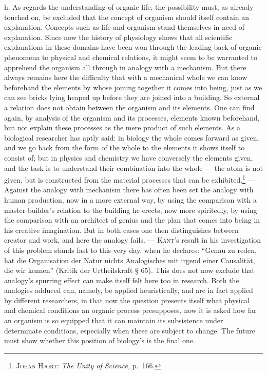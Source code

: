 \documentclass[12pt]{book}
\newcommand{\opage}[1]{\marginnote{\footnotesize\textit{[#1]}}}
\begin{document}
h. As regards the understanding of organic life, the possibility must, as already
touched on, be excluded that the concept of organism should itself contain an
explanation. Concepts such as life and organism stand themselves in need of
explanation. Since now the history of physiology shows that all scientific
explanations in these domains have been won through the leading back of organic
phenomena to physical and chemical relations, it might seem to be warranted to
apprehend the organism all through in analogy with a mechanism. But there always
remains here the difficulty that with a mechanical whole we can know beforehand
the elements by whose joining together it comes into being, just as we can see
bricks lying heaped up before they are joined into a building. So external a
relation does not obtain between the organism and its elements. One can find
again, by analysis of the organism and its processes, elements known beforehand,
but not explain these processes as the mere product of such elements. As a
biological researcher has aptly said: in biology the whole comes forward as given,
and we go back from the form of the whole to the elements it shows itself to
consist of; but in physics and chemistry we have conversely the elements given,
and the task is to understand their combination into the whole --- the atom is not
given, but is constructed from the material processes that can be
exhibited.\footnote{\textsc{Johan Hjort:} \textit{The Unity of Science,} p.\ 166.}
--- Against the analogy with mechanism there has often been set the analogy with
human production, now in a more external way, by using the comparison with a
master-builder's relation to the building he erects, now more spiritedly, by using
the comparison with an architect of genius \opage{107}and the plan that comes into being in
his creative imagination. But in both cases one then distinguishes between creator
and work, and here the analogy fails. --- \textsc{Kant}'s result in his
investigation of this problem stands fast to this very day, when he declares:
``Genau zu reden, hat die Organisation der Natur nichts Analogisches mit irgend
einer Causalität, die wir kennen'' (Kritik der Urtheilskraft § 65). This does not
now exclude that analogy's spurring effect can make itself felt here too in
research. Both the analogies adduced can, namely, be applied heuristically, and
are in fact applied by different researchers, in that now the question presents
itself what physical and chemical conditions an organic process presupposes, now
it is asked how far an organism is so equipped that it can maintain its
subsistence under determinate conditions, especially when these are subject to
change. The future must show whether this position of biology's is the final one.
\end{document}
